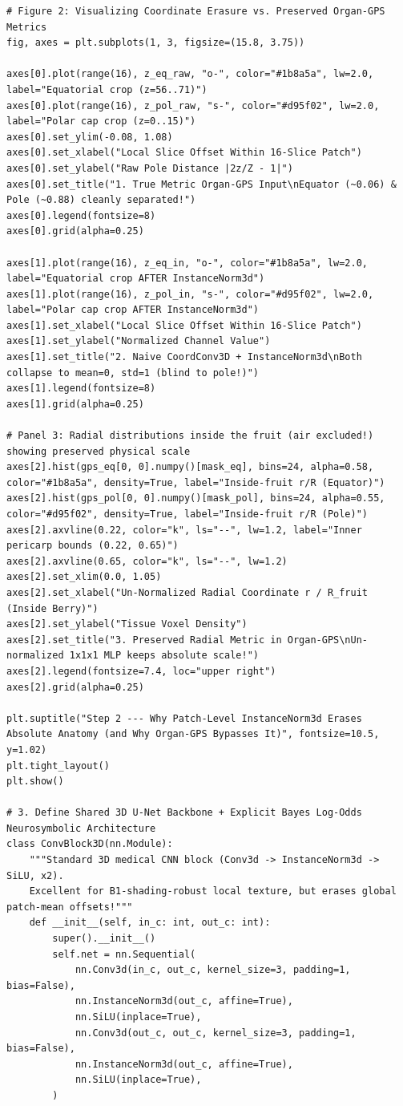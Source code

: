 \documentclass[10pt,a4paper]{article}
\begin{document}
\begin{codebox}
\begin{lstlisting}[style=pybmed]
# Figure 2: Visualizing Coordinate Erasure vs. Preserved Organ-GPS Metrics
fig, axes = plt.subplots(1, 3, figsize=(15.8, 3.75))

axes[0].plot(range(16), z_eq_raw, "o-", color="#1b8a5a", lw=2.0, label="Equatorial crop (z=56..71)")
axes[0].plot(range(16), z_pol_raw, "s-", color="#d95f02", lw=2.0, label="Polar cap crop (z=0..15)")
axes[0].set_ylim(-0.08, 1.08)
axes[0].set_xlabel("Local Slice Offset Within 16-Slice Patch")
axes[0].set_ylabel("Raw Pole Distance |2z/Z - 1|")
axes[0].set_title("1. True Metric Organ-GPS Input\nEquator (~0.06) & Pole (~0.88) cleanly separated!")
axes[0].legend(fontsize=8)
axes[0].grid(alpha=0.25)

axes[1].plot(range(16), z_eq_in, "o-", color="#1b8a5a", lw=2.0, label="Equatorial crop AFTER InstanceNorm3d")
axes[1].plot(range(16), z_pol_in, "s-", color="#d95f02", lw=2.0, label="Polar cap crop AFTER InstanceNorm3d")
axes[1].set_xlabel("Local Slice Offset Within 16-Slice Patch")
axes[1].set_ylabel("Normalized Channel Value")
axes[1].set_title("2. Naive CoordConv3D + InstanceNorm3d\nBoth collapse to mean=0, std=1 (blind to pole!)")
axes[1].legend(fontsize=8)
axes[1].grid(alpha=0.25)

# Panel 3: Radial distributions inside the fruit (air excluded!) showing preserved physical scale
axes[2].hist(gps_eq[0, 0].numpy()[mask_eq], bins=24, alpha=0.58, color="#1b8a5a", density=True, label="Inside-fruit r/R (Equator)")
axes[2].hist(gps_pol[0, 0].numpy()[mask_pol], bins=24, alpha=0.55, color="#d95f02", density=True, label="Inside-fruit r/R (Pole)")
axes[2].axvline(0.22, color="k", ls="--", lw=1.2, label="Inner pericarp bounds (0.22, 0.65)")
axes[2].axvline(0.65, color="k", ls="--", lw=1.2)
axes[2].set_xlim(0.0, 1.05)
axes[2].set_xlabel("Un-Normalized Radial Coordinate r / R_fruit (Inside Berry)")
axes[2].set_ylabel("Tissue Voxel Density")
axes[2].set_title("3. Preserved Radial Metric in Organ-GPS\nUn-normalized 1x1x1 MLP keeps absolute scale!")
axes[2].legend(fontsize=7.4, loc="upper right")
axes[2].grid(alpha=0.25)

plt.suptitle("Step 2 --- Why Patch-Level InstanceNorm3d Erases Absolute Anatomy (and Why Organ-GPS Bypasses It)", fontsize=10.5, y=1.02)
plt.tight_layout()
plt.show()

# 3. Define Shared 3D U-Net Backbone + Explicit Bayes Log-Odds Neurosymbolic Architecture
class ConvBlock3D(nn.Module):
    """Standard 3D medical CNN block (Conv3d -> InstanceNorm3d -> SiLU, x2).
    Excellent for B1-shading-robust local texture, but erases global patch-mean offsets!"""
    def __init__(self, in_c: int, out_c: int):
        super().__init__()
        self.net = nn.Sequential(
            nn.Conv3d(in_c, out_c, kernel_size=3, padding=1, bias=False),
            nn.InstanceNorm3d(out_c, affine=True),
            nn.SiLU(inplace=True),
            nn.Conv3d(out_c, out_c, kernel_size=3, padding=1, bias=False),
            nn.InstanceNorm3d(out_c, affine=True),
            nn.SiLU(inplace=True),
        )


\end{lstlisting}
\end{codebox}
\end{document}
